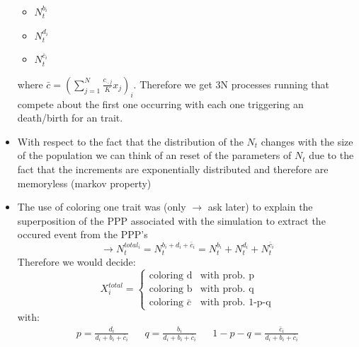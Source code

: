 \documentclass{article}
\begin{document}
\begin{itemize}
		\begin{itemize}
			\item $N_t^{b_i}$
			\item $N_t^{d_i}$
			\item $N_t^{\bar{c}_i}$
		\end{itemize}
	where $\bar{c} = \left(\sum_{j=1}^N \frac{c_{\cdot,j}}{K}x_j\right)_i$. Therefore we get 3N processes running that compete about the first one occurring with each one triggering an death/birth for an trait.
	\item With respect to the fact that the distribution of the $N_t$ changes with the size of the population we can think of an reset of the parameters of $N_t$ due to the fact that the increments are exponentially distributed and therefore are memoryless (markov property)
	\item The use of coloring one trait was (only $\to$ ask later) to explain the superposition of the PPP associated with the simulation to extract the occured event from the PPP's \\
	\[\to N_t^{total_{i}} = N_t^{b_i + d_i + \bar{c}_i} = N_t^{b_i} + N_t^{d_i} + N_t^{\bar{c}_i}\]
Therefore we would decide:
\begin{equation}
	X_i^{total} = 
	\begin{cases}
		\textrm{coloring d} & \textrm{with prob. p}\\
		\textrm{coloring b} & \textrm{with prob. q} \\
		\textrm{coloring }\bar{c} & \textrm{with prob. 1-p-q}  
	\end{cases}
\end{equation}
with:
\begin{align*}
	p = \frac{d_i}{d_i + b_i + \bar{c}_i} && q = \frac{b_i}{d_i + b_i + \bar{c}_i} && 1-p-q = \frac{\bar{c}_i}{d_i + b_i + \bar{c}_i}
\end{align*}
\end{itemize}
\end{document}
